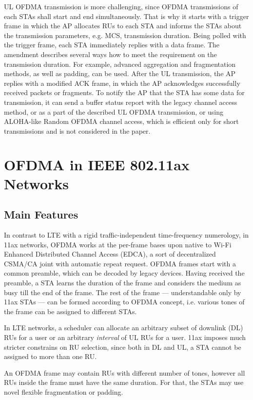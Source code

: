 UL OFDMA transmission is more challenging, since
OFDMA transmissions of each STAs shall start and end
simultaneously. That is why it starts with a trigger frame in
which the AP allocates RUs to each STA and informs the
STAs about the transmission parameters, e.g. MCS, transmission
duration. Being polled with the trigger frame, each
STA immediately replies with a data frame. The amendment
describes several ways how to meet the requirement on the
transmission duration. For example, advanced aggregation and
fragmentation methods, as well as padding, can be used. After
the UL transmission, the AP replies with a modified ACK
frame, in which the AP acknowledges successfully received
packets or fragments. To notify the AP that the STA has
some data for transmission, it can send a buffer status report
with the legacy channel access method, or as a part of the
described UL OFDMA transmission, or using ALOHA-like
Random OFDMA channel access, which is efficient only for
short transmissions and is not considered in the paper.

\section{OFDMA in IEEE 802.11ax Networks}
\subsection{Main Features}

In contrast to LTE with a rigid traffic-independent time-frequency numerology, in 11ax networks, OFDMA works at the per-frame bases upon native to Wi-Fi Enhanced Distributed Channel Access (EDCA), a sort of decentralized CSMA/CA joint with automatic repeat request. OFDMA frames start with a common preamble, which can be decoded by legacy devices. Having received the preamble, a STA learns the duration of the frame and considers the medium as busy till the end of the frame.
The rest of the frame --- understandable only by 11ax STAs --- can be formed according to OFDMA concept, i.e. various tones of the frame can be assigned to different STAs. 

In LTE networks, a scheduler can allocate an arbitrary subset of downlink (DL) RUs for a user or an arbitrary \emph{interval} of UL RUs for a user.
11ax imposes much stricter constrains on RU selection, since both in DL and UL, a STA cannot be assigned to more than one RU.

An OFDMA frame may contain RUs with different number of tones, however all RUs inside the frame must have the same duration.
For that, the STAs may use novel flexible fragmentation or padding. 

